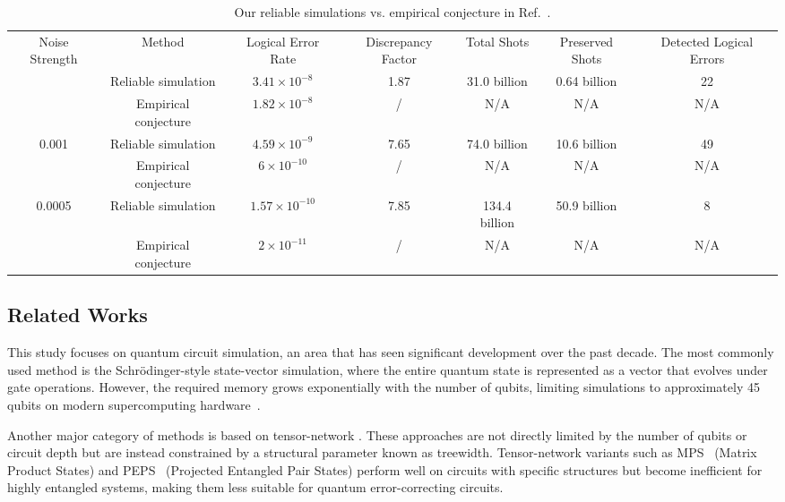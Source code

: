 \documentclass[10pt,conference]{IEEEtran}
\begin{document}
\begin{table}
    \centering
    \caption{Our reliable simulations vs. empirical conjecture in Ref.~\cite{gidney2024magic}.}
    \label{tab1}
    {\begin{tabular}{c|c|c|c|c|c|c}
      \hline
     Noise Strength & Method & Logical Error Rate & Discrepancy Factor & Total Shots & Preserved Shots & Detected Logical Errors \\
      \Xhline{1.5pt}
    \multirow{2}{*}{0.002}  & Reliable simulation  & $3.41\times 10^{-8}$ & 1.87 & 31.0 billion & 0.64 billion  & 22  \\
      \cline{2-7}
    &  Empirical conjecture & $ 1.82\times 10^{-8} $ & / & N/A  & N/A  & N/A \\
    \hline
    \multirow{2}{*}{0.001}  & Reliable simulation  & $4.59\times 10^{-9}$ & 7.65 & 74.0 billion & 10.6 billion  & 49  \\
      \cline{2-7}
    &  Empirical conjecture & $6\times 10^{-10}$ & / & N/A  & N/A  & N/A \\
      \hline
    \multirow{2}{*}{0.0005}  & Reliable simulation  & $1.57\times 10^{-10}$ & 7.85 & 134.4 billion  & 50.9 billion  & 8  \\
      \cline{2-7}
    &  Empirical conjecture & $2\times 10^{-11}$ & / & N/A  & N/A  & N/A \\
      \hline
    \end{tabular}}
  \end{table}

\subsection{Related Works}
This study focuses on quantum circuit simulation, an area that has seen significant development over the past decade.
The most commonly used method is the Schrödinger-style state-vector simulation, where the entire quantum state is represented as a vector that evolves under gate operations.
However, the required memory grows exponentially with the number of qubits, limiting simulations to approximately 45 qubits on modern supercomputing hardware~\cite{haner2017, Sunway2019massively, Sunway2019quantum, de2025universal}.

Another major category of methods is based on tensor-network \cite{huang2020classical, liu2021GB, pan2022solving, fu2024surpassing}.
These approaches are not directly limited by the number of qubits or circuit depth but are instead constrained by a structural parameter known as treewidth.
Tensor-network variants such as MPS~\cite{ayral2023density} (Matrix Product States) and PEPS~\cite{patra2024efficient} (Projected Entangled Pair States) perform well on circuits with specific structures but become inefficient for highly entangled systems, making them less suitable for quantum error-correcting circuits.
\end{document}
